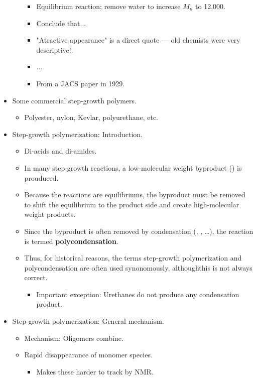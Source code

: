 \documentclass[../notes.tex]{subfiles}
\begin{document}
\begin{itemize}
\begin{itemize}
\begin{itemize}
            \item Equilibrium reaction; remove water to increase $M_n$ to 12,000.
            \item Conclude that...
            \item "Atractive appearance" is a direct quote --- old chemists were very descriptive!.
            \item ...
            \item From a JACS paper in 1929.
        \end{itemize}
    \end{itemize}
    \item Some commercial step-growth polymers.
    \begin{itemize}
        \item Polyester, nylon, Kevlar, polyurethane, etc.
    \end{itemize}
    \item Step-growth polymerization: Introduction.
    \begin{itemize}
        \item Di-acids and di-amides.
        \item In many step-growth reactions, a low-molecular weight byproduct () is prouduced.
        \item Because the reactions are equilibriums, the byproduct must be removed to shift the equilibrium to the product side and create high-molecular weight products.
        \item Since the byproduct is often removed by condensation (, , \dots), the reaction is termed \textbf{polycondensation}.
        \item Thus, for historical reasons, the terms step-growth polymerization and polycondensation are often used synonomously, althoughthis is not always correct.
        \begin{itemize}
            \item Important exception: Urethanes do not produce any condensation product.
        \end{itemize}
    \end{itemize}
    \item Step-growth polymerization: General mechanism.
    \begin{itemize}
        \item Mechanism: Oligomers combine.
        \item Rapid disappearance of monomer species.
        \begin{itemize}
            \item Makes these harder to track by NMR.

\end{itemize}
\end{itemize}
\end{itemize}
\end{document}
